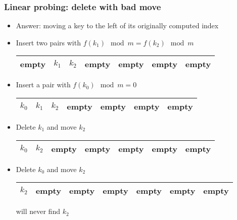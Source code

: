 \documentclass[trans]{beamer}
\begin{document}
\begin{frame}[fragile=singleslide]
\frametitle{Linear probing: delete with bad move}
\begin{itemize}
\item Answer: moving a key to the left of its originally computed index
\item Insert two pairs with $f(k_1) \mod m = f(k_2) \mod m$
\begin{tabular}{|p{1cm}|p{1cm}|p{1cm}|p{1cm}|p{1cm}|p{1cm}|p{1cm}|}
\hline 
empty & $k_1$ & $k_2$ & empty & empty & empty & empty \\
\hline 
\end{tabular}

\item Insert a pair with $f(k_0) \mod m = 0$
\begin{tabular}{|p{1cm}|p{1cm}|p{1cm}|p{1cm}|p{1cm}|p{1cm}|p{1cm}|}
\hline 
$k_0$ & $k_1$ & $k_2$ & empty & empty & empty & empty \\
\hline 
\end{tabular}

\item Delete $k_1$ and move $k_2$
\begin{tabular}{|p{1cm}|p{1cm}|p{1cm}|p{1cm}|p{1cm}|p{1cm}|p{1cm}|}
\hline 
$k_0$ & $k_2$ & empty & empty & empty & empty & empty \\
\hline 
\end{tabular}
\item Delete $k_0$ and move $k_2$
\begin{tabular}{|p{1cm}|p{1cm}|p{1cm}|p{1cm}|p{1cm}|p{1cm}|p{1cm}|}
\hline 
$k_2$ & empty & empty & empty & empty & empty & empty \\
\hline 
\end{tabular}

will never find $k_2$
\end{itemize}
\end{frame}
\end{document}
